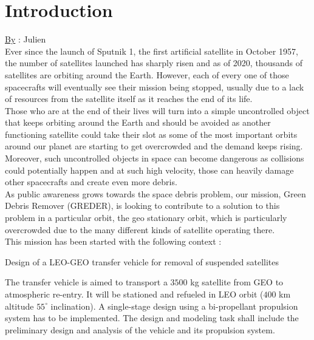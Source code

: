 \chapter*{Introduction}
\qquad \underline{By} : Julien\\

 Ever since the launch of Sputnik 1, the first artificial satellite in October 1957, the number of satellites launched has sharply risen and as of 2020, thousands of satellites are orbiting around the Earth. However, each of every one of those spacecrafts will eventually see their mission being stopped, usually due to a lack of resources from the satellite itself as it reaches the end of its life. \\

Those who are at the end of their lives will turn into a simple uncontrolled object that keeps orbiting around the Earth and should be avoided as another functioning satellite could take their slot as some of the most important orbits around our planet are starting to get overcrowded and the demand keeps rising.\\

Moreover, such uncontrolled objects in space can become dangerous as collisions could potentially happen and at such high velocity, those can heavily damage other spacecrafts and create even more debris.\\

As public awareness grows towards the space debris problem, our mission, Green Debris Remover (GREDER), is looking to contribute to a solution to this problem in a particular orbit, the geo stationary orbit, which is particularly overcrowded due to the many different kinds of satellite operating there. \\

This mission has been started with the following context :\\
\begin{center}
	Design of a LEO-GEO transfer vehicle for removal of suspended satellites
\end{center}
The transfer vehicle is aimed to transport a $3500$ kg satellite from GEO to atmospheric re-entry. It  will  be  stationed and  refueled in  LEO orbit ($400$ km altitude $55^\circ$ inclination). A single-stage design using  a  bi-propellant  propulsion  system has  to  be implemented. The  design  and modeling  task  shall include the  preliminary  design  and  analysis  of  the vehicle and  its propulsion system.
